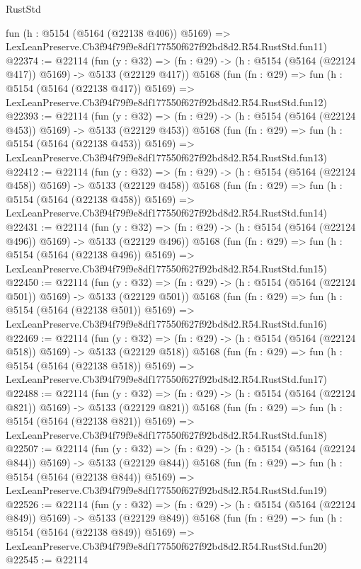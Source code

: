 \begin{lexlean}{RustStd}
\begin{coremodule}
    fun (h : @5154 (@5164 (@22138 @406)) @5169) =>
    LexLeanPreserve.Cb3f94f79f9e8df177550f627f92bd8d2.R54.RustStd.fun11)
@22374 := @22114
    (fun (y : @32) => (fn : @29) -> (h : @5154 (@5164 (@22124 @417)) @5169) -> @5133 (@22129 @417))
    @5168
    (fun (fn : @29) =>
    fun (h : @5154 (@5164 (@22138 @417)) @5169) =>
    LexLeanPreserve.Cb3f94f79f9e8df177550f627f92bd8d2.R54.RustStd.fun12)
@22393 := @22114
    (fun (y : @32) => (fn : @29) -> (h : @5154 (@5164 (@22124 @453)) @5169) -> @5133 (@22129 @453))
    @5168
    (fun (fn : @29) =>
    fun (h : @5154 (@5164 (@22138 @453)) @5169) =>
    LexLeanPreserve.Cb3f94f79f9e8df177550f627f92bd8d2.R54.RustStd.fun13)
@22412 := @22114
    (fun (y : @32) => (fn : @29) -> (h : @5154 (@5164 (@22124 @458)) @5169) -> @5133 (@22129 @458))
    @5168
    (fun (fn : @29) =>
    fun (h : @5154 (@5164 (@22138 @458)) @5169) =>
    LexLeanPreserve.Cb3f94f79f9e8df177550f627f92bd8d2.R54.RustStd.fun14)
@22431 := @22114
    (fun (y : @32) => (fn : @29) -> (h : @5154 (@5164 (@22124 @496)) @5169) -> @5133 (@22129 @496))
    @5168
    (fun (fn : @29) =>
    fun (h : @5154 (@5164 (@22138 @496)) @5169) =>
    LexLeanPreserve.Cb3f94f79f9e8df177550f627f92bd8d2.R54.RustStd.fun15)
@22450 := @22114
    (fun (y : @32) => (fn : @29) -> (h : @5154 (@5164 (@22124 @501)) @5169) -> @5133 (@22129 @501))
    @5168
    (fun (fn : @29) =>
    fun (h : @5154 (@5164 (@22138 @501)) @5169) =>
    LexLeanPreserve.Cb3f94f79f9e8df177550f627f92bd8d2.R54.RustStd.fun16)
@22469 := @22114
    (fun (y : @32) => (fn : @29) -> (h : @5154 (@5164 (@22124 @518)) @5169) -> @5133 (@22129 @518))
    @5168
    (fun (fn : @29) =>
    fun (h : @5154 (@5164 (@22138 @518)) @5169) =>
    LexLeanPreserve.Cb3f94f79f9e8df177550f627f92bd8d2.R54.RustStd.fun17)
@22488 := @22114
    (fun (y : @32) => (fn : @29) -> (h : @5154 (@5164 (@22124 @821)) @5169) -> @5133 (@22129 @821))
    @5168
    (fun (fn : @29) =>
    fun (h : @5154 (@5164 (@22138 @821)) @5169) =>
    LexLeanPreserve.Cb3f94f79f9e8df177550f627f92bd8d2.R54.RustStd.fun18)
@22507 := @22114
    (fun (y : @32) => (fn : @29) -> (h : @5154 (@5164 (@22124 @844)) @5169) -> @5133 (@22129 @844))
    @5168
    (fun (fn : @29) =>
    fun (h : @5154 (@5164 (@22138 @844)) @5169) =>
    LexLeanPreserve.Cb3f94f79f9e8df177550f627f92bd8d2.R54.RustStd.fun19)
@22526 := @22114
    (fun (y : @32) => (fn : @29) -> (h : @5154 (@5164 (@22124 @849)) @5169) -> @5133 (@22129 @849))
    @5168
    (fun (fn : @29) =>
    fun (h : @5154 (@5164 (@22138 @849)) @5169) =>
    LexLeanPreserve.Cb3f94f79f9e8df177550f627f92bd8d2.R54.RustStd.fun20)
@22545 := @22114

\end{coremodule}
\end{lexlean}
